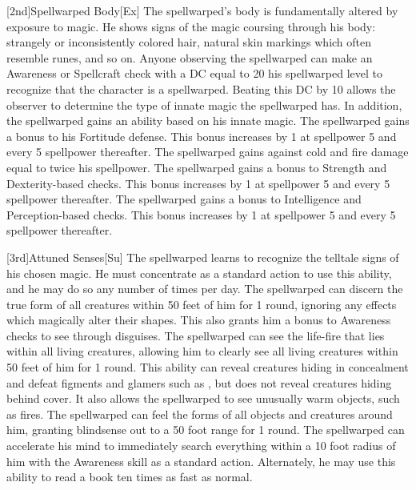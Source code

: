 [2nd]{Spellwarped Body}[Ex]
The spellwarped's body is fundamentally altered by exposure to magic.
He shows signs of the magic coursing through his body: strangely or inconsistently colored hair, natural skin markings which often resemble runes, and so on.
Anyone observing the spellwarped can make an Awareness or Spellcraft check with a DC equal to 20 \sub his spellwarped level to recognize that the character is a spellwarped.
Beating this DC by 10 allows the observer to determine the type of innate magic the spellwarped has.
In addition, the spellwarped gains an ability based on his innate magic.
    The spellwarped gains a  bonus to his Fortitude defense.
    This bonus increases by 1 at spellpower 5 and every 5 spellpower thereafter.
    The spellwarped gains  against cold and fire damage equal to twice his spellpower.
    The spellwarped gains a  bonus to Strength and Dexterity-based checks.
    This bonus increases by 1 at spellpower 5 and every 5 spellpower thereafter.
    The spellwarped gains a  bonus to Intelligence and Perception-based checks.
    This bonus increases by 1 at spellpower 5 and every 5 spellpower thereafter.

[3rd]{Attuned Senses}[Su]
The spellwarped learns to recognize the telltale signs of his chosen magic.
He must concentrate as a standard action to use this ability, and he may do so any number of times per day.
    The spellwarped can discern the true form of all creatures within 50 feet of him for 1 round, ignoring any effects which magically alter their shapes.
    This also grants him a  bonus to Awareness checks to see through disguises.
    The spellwarped can see the life-fire that lies within all living creatures, allowing him to clearly see all living creatures within 50 feet of him for 1 round.
    This ability can reveal creatures hiding in concealment and defeat figments and glamers such as , but does not reveal creatures hiding behind cover.
    It also allows the spellwarped to see unusually warm objects, such as fires.
    The spellwarped can feel the forms of all objects and creatures around him, granting blindsense out to a 50 foot range for 1 round.
    The spellwarped can accelerate his mind to immediately search everything within a 10 foot radius of him with the Awareness skill as a standard action.
    Alternately, he may use this ability to read a book ten times as fast as normal.

